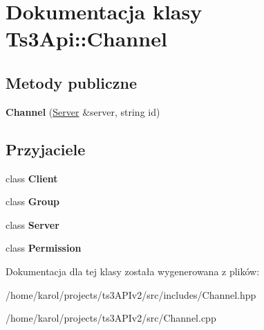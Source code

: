 \hypertarget{class_ts3_api_1_1_channel}{}\section{Dokumentacja klasy Ts3\+Api\+:\+:Channel}
\label{class_ts3_api_1_1_channel}
\subsection*{Metody publiczne}
\begin{DoxyCompactItemize}
\item 
{\bfseries Channel} (\hyperlink{class_ts3_api_1_1_server}{Server} \&server, string id)\hypertarget{class_ts3_api_1_1_channel_acd05a5d2e70f685ba67d37bc186be700}{}\label{class_ts3_api_1_1_channel_acd05a5d2e70f685ba67d37bc186be700}

\end{DoxyCompactItemize}
\subsection*{Przyjaciele}
\begin{DoxyCompactItemize}
\item 
class {\bfseries Client}\hypertarget{class_ts3_api_1_1_channel_a5db1c99e2c94b26278f3838c85cdb618}{}\label{class_ts3_api_1_1_channel_a5db1c99e2c94b26278f3838c85cdb618}

\item 
class {\bfseries Group}\hypertarget{class_ts3_api_1_1_channel_a2697825715974a353728f0d4d5658112}{}\label{class_ts3_api_1_1_channel_a2697825715974a353728f0d4d5658112}

\item 
class {\bfseries Server}\hypertarget{class_ts3_api_1_1_channel_ac2055578ac48afabe5af487878450f68}{}\label{class_ts3_api_1_1_channel_ac2055578ac48afabe5af487878450f68}

\item 
class {\bfseries Permission}\hypertarget{class_ts3_api_1_1_channel_ad3834bbd6b2c4839e7f69dc4cc1d6ae6}{}\label{class_ts3_api_1_1_channel_ad3834bbd6b2c4839e7f69dc4cc1d6ae6}

\end{DoxyCompactItemize}


Dokumentacja dla tej klasy została wygenerowana z plików\+:\begin{DoxyCompactItemize}
\item 
/home/karol/projects/ts3\+A\+P\+Iv2/src/includes/Channel.\+hpp\item 
/home/karol/projects/ts3\+A\+P\+Iv2/src/Channel.\+cpp\end{DoxyCompactItemize}
